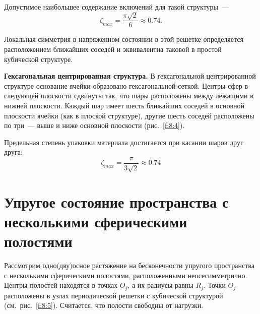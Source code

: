 %

Допустимое наибольшее содержание включений для такой структуры~---
$$
\zeta_{max}=\frac{\pi\sqrt{2}}{6}\approx 0.74.
$$

Локальная симметрия в напряженном состоянии в этой решетке определяется расположением ближайших соседей и эквивалентна таковой в простой кубической структуре.

\textbf{Гексагональная центрированная структура.} В гексагональной центрированной структуре основание ячейки образовано гексагональной сеткой. Центры сфер в следующей плоскости сдвинуты так, что шары расположены между лежащими в нижней плоскости. Каждый шар имеет шесть ближайших соседей в основной плоскости ячейки (как в плоской структуре), другие шесть соседей расположены по три~--- выше и ниже основной плоскости (рис.~\ref{f:8:4}).

Предельная степень упаковки материала достигается при касании шаров друг друга:
$$
\zeta_{max}=\frac{\pi}{3\sqrt{2}}\approx 0.74
$$

\section{Упругое состояние пространства с несколькими сферическими полостями}


Рассмотрим одно(дву)осное растяжение на бесконечности упругого пространства с несколькими сферическими полостями, расположенными неосесимметрично. Центры полостей находятся в точках $O_j$, а их радиусы равны $R_j$. Точки $O_j$ расположены в узлах периодической решетки с кубической структурой (см.~рис.~\ref{f:8:5}). Считается, что полости свободны от нагрузки.

